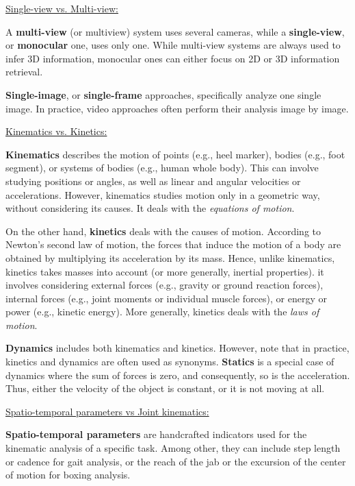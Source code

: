 \vspace*{0.5cm}

\noindent\underline{Single-view vs. Multi-view:}

A \textbf{multi-view} (or multiview) system uses several cameras, while a \textbf{single-view}, or \textbf{monocular} one, uses only one. While multi-view systems are always used to infer 3D information, monocular ones can either focus on 2D or 3D information retrieval.

\textbf{Single-image}, or \textbf{single-frame} approaches, specifically analyze one single image. In practice, video approaches often perform their analysis image by image.

\vspace*{0.5cm}

\noindent\underline{Kinematics vs. Kinetics: }

\textbf{Kinematics} describes the motion of points (e.g., heel marker), bodies (e.g., foot segment), or systems of bodies (e.g., human whole body). This can involve studying positions or angles, as well as linear and angular velocities or accelerations. However, kinematics studies motion only in a geometric way, without considering its causes. It deals with the \emph{equations of motion}.

On the other hand, \textbf{kinetics} deals with the causes of motion. According to Newton's second law of motion, the forces that induce the motion of a body are obtained by multiplying its acceleration by its mass. Hence, unlike kinematics, kinetics takes masses into account (or more generally, inertial properties). it involves considering external forces (e.g., gravity or ground reaction forces), internal forces (e.g., joint moments or individual muscle forces), or energy or power (e.g., kinetic energy). More generally, kinetics deals with the \emph{laws of motion}.

\textbf{Dynamics} includes both kinematics and kinetics. However, note that in practice, kinetics and dynamics are often used as synonyms. \textbf{Statics} is a special case of dynamics where the sum of forces is zero, and consequently, so is the acceleration. Thus, either the velocity of the object is constant, or it is not moving at all. 

\vspace*{0.5cm}

\noindent\underline{Spatio-temporal parameters vs Joint kinematics:}

\textbf{Spatio-temporal parameters} are handcrafted indicators used for the kinematic analysis of a specific task. Among other, they can include step length or cadence for gait analysis, or the reach of the jab or the excursion of the center of motion for boxing analysis.


